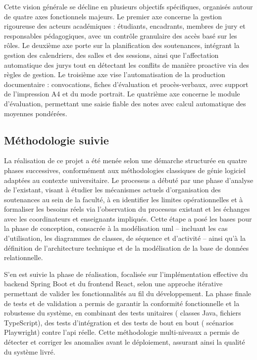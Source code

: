 Cette vision générale se décline en plusieurs objectifs spécifiques, organisés autour de quatre axes fonctionnels majeurs. Le premier axe concerne la gestion rigoureuse des acteurs académiques : étudiants, encadrants, membres de jury et responsables pédagogiques, avec un contrôle granulaire des accès basé sur les rôles. Le deuxième axe porte sur la planification des soutenances, intégrant la gestion des calendriers, des salles et des sessions, ainsi que l'affectation automatique des jurys tout en détectant les conflits de manière proactive via des règles de gestion. Le troisième axe vise l'automatisation de la production documentaire : convocations, fiches d'évaluation et procès-verbaux, avec support de l'impression A4 et du mode portrait. Le quatrième axe concerne le module d'évaluation, permettant une saisie fiable des notes avec calcul automatique des moyennes pondérées.

\subsection*{Méthodologie suivie}
\label{intro:methodologie}

La réalisation de ce projet a été menée selon une démarche structurée en quatre phases successives, conformément aux méthodologies classiques de génie logiciel adaptées au contexte universitaire. Le processus a débuté par une phase d'analyse de l'existant, visant à étudier les mécanismes actuels d'organisation des soutenances au sein de la faculté, à en identifier les limites opérationnelles et à formaliser les besoins réels via l'observation du processus existant et les échanges avec les coordinateurs et enseignants impliqués. Cette étape a posé les bases pour la phase de conception, consacrée à la modélisation \acrshort{uml} -- incluant les cas d'utilisation, les diagrammes de classes, de séquence et d'activité -- ainsi qu'à la définition de l'architecture technique et de la modélisation de la base de données relationnelle.

S'en est suivie la phase de réalisation, focalisée sur l'implémentation effective du backend Spring Boot et du frontend React, selon une approche itérative permettant de valider les fonctionnalités au fil du développement. La phase finale de tests et de validation a permis de garantir la conformité fonctionnelle et la robustesse du système, en combinant des tests unitaires ( classes Java,  fichiers TypeScript), des tests d'intégration et des tests de bout en bout ( scénarios Playwright) contre l'\gls{api} réelle. Cette méthodologie multi-niveaux a permis de détecter et corriger les anomalies avant le déploiement, assurant ainsi la qualité du système livré.

